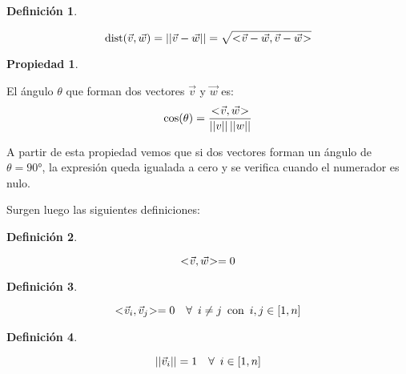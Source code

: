 \documentclass[a5paper,12pt,twoside]{book}
\newtheorem{defn}{{Definición}}[chapter]
\newtheorem{prop}{{Propiedad}}[chapter]
\begin{document}
\begin{mdframed}[style=MyFrame1]
    \begin{defn}
    \end{defn}
    \begin{equation*}
        \operatorname{dist}(\Vec{v},\Vec{w}) = {\left|\left| {\Vec{v}-\Vec{w}} \right|\right|} = \sqrt{<\hspace{-0.8mm}\Vec{v}-\Vec{w},\Vec{v}-\Vec{w}\hspace{-0.8mm}>}
    \end{equation*}
\end{mdframed}

\begin{mdframed}[style=MyFrame1]
    \begin{prop}
    \end{prop}
    El ángulo $\theta$ que forman dos vectores $\Vec{v}$ y $\Vec{w}$ es:
    \begin{equation*}
        \cos(\theta) = \frac{<\hspace{-0.8mm}\Vec{v},\Vec{w}\hspace{-0.8mm}>}{{\left|\left| {v} \right|\right|} \, {\left|\left| {w} \right|\right|}}
    \end{equation*}
\end{mdframed}

A partir de esta propiedad vemos que si dos vectores forman un ángulo de $\theta=\ang{90}$, la expresión queda igualada a cero y se verifica cuando el numerador es nulo.

Surgen luego las siguientes definiciones:

\begin{mdframed}[style=MyFrame1]
    \begin{defn}
    \end{defn}
    \begin{equation*}
        <\hspace{-0.8mm}\Vec{v},\Vec{w}\hspace{-0.8mm}> = 0
    \end{equation*}
\end{mdframed}

\begin{mdframed}[style=MyFrame1]
    \begin{defn}
    \end{defn}
    \begin{equation*}
        <\hspace{-0.8mm}\Vec{v}_i,\Vec{v}_j\hspace{-0.8mm}> = 0 \quad \forall \enspace  i\neq j \enspace \textrm{con} \enspace i,j \in [1,n]
    \end{equation*}
\end{mdframed}

\begin{mdframed}[style=MyFrame1]
    \begin{defn}
    \end{defn}
    \begin{equation*}
        {\left|\left| {\Vec{v}_i} \right|\right|} = 1 \quad \forall \enspace  i \in [1,n]
    \end{equation*}
\end{mdframed}
\end{document}

